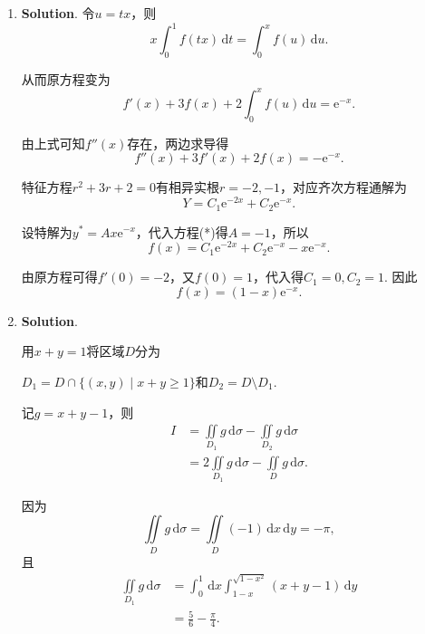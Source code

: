 \documentclass[../Main.tex]{subfiles}
\begin{document}
\begin{enumerate}
    \item \textbf{Solution}. 令$u=tx$，则
          \[
              x\int_{0}^{1}f(tx)\,\mathrm{d}t=\int_{0}^{x}f(u)\,\mathrm{d}u.
          \]

          从而原方程变为
          \[
              f'(x)+3f(x)+2\int_{0}^{x}f(u)\,\mathrm{d}u=\mathrm{e}^{-x}.
          \]

          由上式可知$f''(x)$存在，两边求导得
          \[
              f''(x)+3f'(x)+2f(x)=-\mathrm{e}^{-x}. \tag{*}
          \]

          特征方程$r^{2}+3r+2=0$有相异实根$r=-2,-1$，对应齐次方程通解为
          \[
              Y=C_{1}\mathrm{e}^{-2x}+C_{2}\mathrm{e}^{-x}.
          \]

          设特解为$y^{*}=Ax\mathrm{e}^{-x}$，代入方程(*)得$A=-1$，所以
          \[
              f(x)=C_{1}\mathrm{e}^{-2x}+C_{2}\mathrm{e}^{-x}-x\mathrm{e}^{-x}.
          \]

          由原方程可得$f'(0)=-2$，又$f(0)=1$，代入得$C_{1}=0,C_{2}=1$.
          因此
          \[
              f(x)=(1-x)\mathrm{e}^{-x}.
          \]

    \item \textbf{Solution}.

          \noindent
          \begin{minipage}[c]{0.60\textwidth}
              用$x+y=1$将区域$D$分为

              $D_{1}=D\cap\{(x,y)\mid x+y\geq1\}$和$D_{2}=D\setminus D_{1}$.

              记$g=x+y-1$，则
              \[
                  \begin{aligned}
                      I & =\iint\limits_{D_{1}}g\,\mathrm{d}\sigma-\iint\limits_{D_{2}}g\,\mathrm{d}\sigma \\
                        & =2\iint\limits_{D_{1}}g\,\mathrm{d}\sigma-\iint\limits_{D}g\,\mathrm{d}\sigma.
                  \end{aligned}
              \]

              因为
              \[
                  \iint\limits_{D}g\,\mathrm{d}\sigma=\iint\limits_{D}(-1)\,\mathrm{d}x\,\mathrm{d}y=-\pi,
              \]
              且
              \[
                  \begin{aligned}
                      \iint\limits_{D_{1}}g\,\mathrm{d}\sigma
                       & =\int_{0}^{1}\,\mathrm{d}x\int_{1-x}^{\sqrt{1-x^{2}}}(x+y-1)\,\mathrm{d}y \\
                       & =\frac{5}{6}-\frac{\pi}{4}.
                  \end{aligned}
              \]


\end{minipage}
\end{enumerate}
\end{document}
